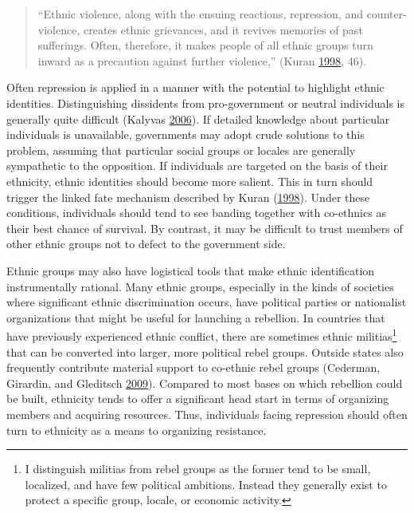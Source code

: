 \documentclass[12pt,]{book}
\let\rmarkdownfootnote\footnote%
\def\footnote{\protect\rmarkdownfootnote}
\theoremstyle{definition}
\theoremstyle{definition}
\theoremstyle{definition}
\theoremstyle{remark}
\begin{document}
\begin{quote}
``Ethnic violence, along with the ensuing reactions, repression, and
counter-violence, creates ethnic grievances, and it revives memories of
past sufferings. Often, therefore, it makes people of all ethnic groups
turn inward as a precaution against further violence,'' (Kuran
\protect\hyperlink{ref-Kuran1998}{1998}, 46).
\end{quote}

Often repression is applied in a manner with the potential to highlight
ethnic identities. Distinguishing dissidents from pro-government or
neutral individuals is generally quite difficult (Kalyvas
\protect\hyperlink{ref-Kalyvas2006}{2006}). If detailed knowledge about
particular individuals is unavailable, governments may adopt crude
solutions to this problem, assuming that particular social groups or
locales are generally sympathetic to the opposition. If individuals are
targeted on the basis of their ethnicity, ethnic identities should
become more salient. This in turn should trigger the linked fate
mechanism described by Kuran (\protect\hyperlink{ref-Kuran1998}{1998}).
Under these conditions, individuals should tend to see banding together
with co-ethnics as their best chance of survival. By contrast, it may be
difficult to trust members of other ethnic groups not to defect to the
government side.

Ethnic groups may also have logistical tools that make ethnic
identification instrumentally rational. Many ethnic groups, especially
in the kinds of societies where significant ethnic discrimination
occurs, have political parties or nationalist organizations that might
be useful for launching a rebellion. In countries that have previously
experienced ethnic conflict, there are sometimes ethnic
militias\footnote{I distinguish militias from rebel groups as the former
  tend to be small, localized, and have few political ambitions. Instead
  they generally exist to protect a specific group, locale, or economic
  activity.} that can be converted into larger, more political rebel
groups. Outside states also frequently contribute material support to
co-ethnic rebel groups (Cederman, Girardin, and Gleditsch
\protect\hyperlink{ref-Cederman2009}{2009}). Compared to most bases on
which rebellion could be built, ethnicity tends to offer a significant
head start in terms of organizing members and acquiring resources. Thus,
individuals facing repression should often turn to ethnicity as a means
to organizing resistance.
\end{document}
